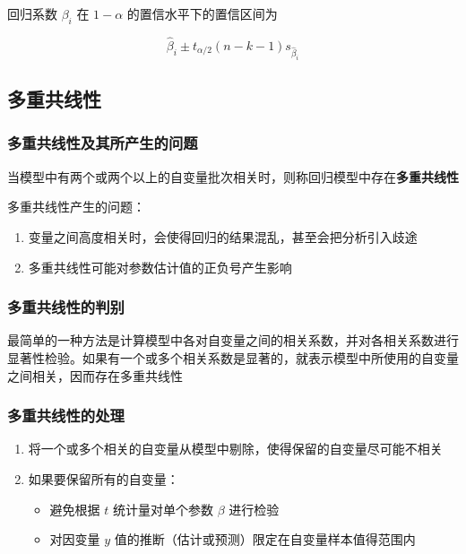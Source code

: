 \documentclass[UTF8,10pt]{book}
\begin{document}
回归系数 \(\beta_i\) 在 \(1-\alpha\) 的置信水平下的置信区间为

\[\hat{\beta}_i \pm t_{\alpha /2}(n-k-1)s_{\hat{\beta}_i}\]

\subsection{多重共线性}\label{header-n258}

\subsubsection{多重共线性及其所产生的问题}\label{header-n259}

当模型中有两个或两个以上的自变量批次相关时，则称回归模型中存在\textbf{多重共线性}

多重共线性产生的问题：

\begin{enumerate}
	\def\labelenumi{\arabic{enumi}.}
	\item
	变量之间高度相关时，会使得回归的结果混乱，甚至会把分析引入歧途
	\item
	多重共线性可能对参数估计值的正负号产生影响
\end{enumerate}

\subsubsection{多重共线性的判别}\label{header-n267}

最简单的一种方法是计算模型中各对自变量之间的相关系数，并对各相关系数进行显著性检验。如果有一个或多个相关系数是显著的，就表示模型中所使用的自变量之间相关，因而存在多重共线性

\subsubsection{多重共线性的处理}\label{header-n269}

\begin{enumerate}
	\def\labelenumi{\arabic{enumi}.}
	\item
	将一个或多个相关的自变量从模型中剔除，使得保留的自变量尽可能不相关
	\item
	如果要保留所有的自变量：
	
	\begin{itemize}
		\item
		避免根据 \(t\) 统计量对单个参数 \(\beta\) 进行检验
		\item
		对因变量 \(y\) 值的推断（估计或预测）限定在自变量样本值得范围内
	\end{itemize}
\end{enumerate}
\end{document}
